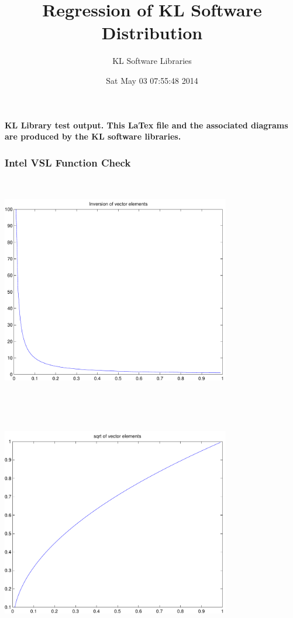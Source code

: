 \documentclass[9pt]{article}
\theoremstyle{plain}
\theoremstyle{definition}
\theoremstyle{remark}
\numberwithin{equation}{section}
\begin{document}
\title{Regression of KL Software Distribution   }
\author{KL Software Libraries}
\date{Sat May 03 07:55:48 2014
}
\maketitle
\textbf{ KL Library test output.  This LaTex file and the associated diagrams are produced by the KL software libraries.}
\subsubsection{Intel VSL Function Check}
\includegraphics[width=10.0cm,height=10.0cm]{klVSLInv.pdf}

\includegraphics[width=10.0cm,height=10.0cm]{klVSLSqrt.pdf}
\end{document}
